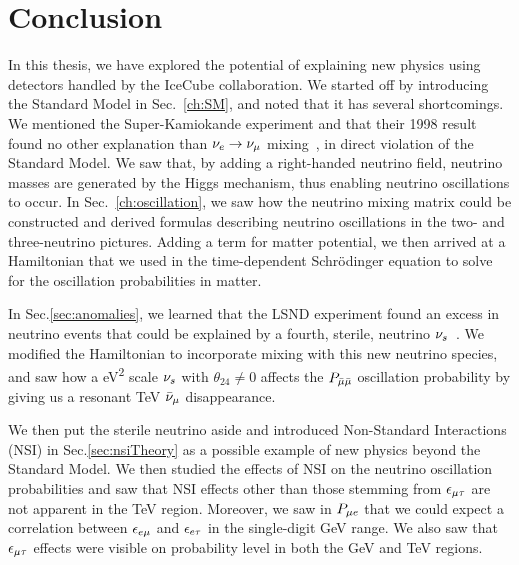 \chapter{Conclusion}\label{ch:conc}
In this thesis, we have explored the potential of explaining new physics using detectors handled by the IceCube collaboration.
We started off by introducing the Standard Model in Sec.~\ref{ch:SM}, and noted that it has several shortcomings. 
We mentioned the Super-Kamiokande experiment and that their 1998 result found no other explanation than $\nu_e \to \nu_\mu$ mixing~\cite{sk1998}, in direct violation of the Standard Model. 
We saw that, by adding a right-handed neutrino field, neutrino masses are generated by the Higgs mechanism, thus enabling neutrino oscillations to occur. 
In Sec.~\ref{ch:oscillation}, we saw how the neutrino mixing matrix could be constructed and derived formulas describing neutrino oscillations in the two- and three-neutrino pictures. Adding a term for matter potential,
we then arrived at a Hamiltonian that we used in the time-dependent Schrödinger equation to solve for the oscillation probabilities in matter.

In Sec.\ref{sec:anomalies}, we learned that the LSND experiment found an excess in neutrino events that could be explained by a fourth, sterile, neutrino $\nu_s$~\cite{lsnd}.
We modified the Hamiltonian to incorporate mixing with this new neutrino species, and saw how a \si{\eV^2} scale  $\nu_s$ with $\theta_{24}\neq 0$ affects the $P_{\bar{\mu} \bar{\mu}}$ oscillation probability 
by giving us a resonant \si{\TeV} $\bar{\nu}_\mu$ disappearance.

We then put the sterile neutrino aside and introduced Non-Standard Interactions (NSI) in Sec.\ref{sec:nsiTheory} as a possible example of new physics beyond the Standard Model.
We then studied the effects of NSI on the neutrino oscillation probabilities and saw that NSI effects other than those stemming from $\epsilon_{\mu\tau}$ are not apparent in the \si{\TeV} region.
Moreover, we saw in $P_{\mu e}$ that we could expect a correlation between $\epsilon_{e\mu}$ and $\epsilon_{e\tau}$ in the single-digit \si{\GeV} range.
We also saw that $\epsilon_{\mu\tau}$ effects were visible on probability level in both the \si{\GeV} and \si{\TeV} regions.

